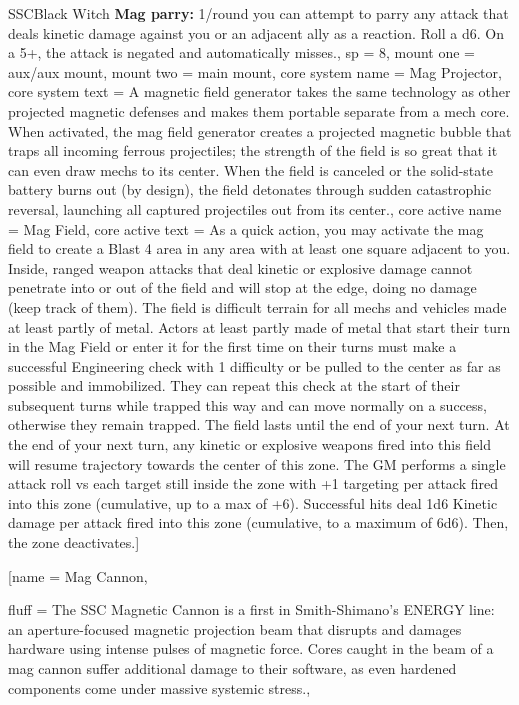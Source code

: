 \begin{mech}{SSC}{Black Witch}
{\textbf{Mag parry:} 1/round you can attempt to parry any attack that deals kinetic damage against you or an adjacent ally as a reaction. Roll a d6. On a 5+, the attack is negated and automatically misses.},
sp = 8,
mount one = aux/aux mount,
mount two = main mount,
core system name = Mag Projector,
core system text = {A magnetic field generator takes the same technology as other projected magnetic defenses and makes them portable separate from a mech core. When activated, the mag field generator creates a projected magnetic bubble that traps all incoming ferrous projectiles; the strength of the field is so great that it can even draw mechs to its center. When the field is canceled or the solid-state battery burns out (by design), the field detonates through sudden catastrophic reversal, launching all captured projectiles out from its center.},
core active name = Mag Field,
core active text = {As a quick action, you may activate the mag field to create a Blast 4 area in any area with at least one square adjacent to you. Inside, ranged weapon attacks that deal kinetic or explosive damage cannot penetrate into or out of the field and will stop at the edge, doing no damage (keep track of them). The field is difficult terrain for all mechs and vehicles made at least partly of metal. Actors at least partly made of metal that start their turn in the Mag Field or enter it for the first time on their turns must make a successful Engineering check with 1 difficulty or be pulled to the center as far as possible and immobilized. They can repeat this check at the start of their subsequent turns while trapped this way and can move normally on a success, otherwise they remain trapped. The field lasts until the end of your next turn. At the end of your next turn, any kinetic or explosive weapons fired into this field will resume trajectory towards the center of this zone. The GM performs a single attack roll vs each target still inside the zone with +1 targeting per attack fired into this zone (cumulative, up to a max of +6). Successful hits deal 1d6 Kinetic damage per attack fired into this zone (cumulative, to a maximum of 6d6). Then, the zone deactivates.}]

\gearBox
[name = {Mag Cannon},

fluff = {The SSC Magnetic Cannon is a first in Smith-Shimano's ENERGY line: an aperture-focused magnetic projection beam that disrupts and damages hardware using intense pulses of magnetic force. Cores caught in the beam of a mag cannon suffer additional damage to their software, as even hardened components come under massive systemic stress.},


\end{mech}
